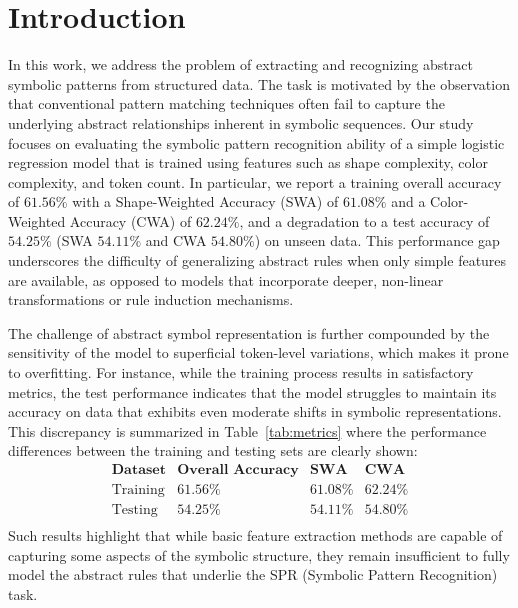\documentclass{article}
\begin{document}
\section{Introduction}
In this work, we address the problem of extracting and recognizing abstract symbolic patterns from structured data. The task is motivated by the observation that conventional pattern matching techniques often fail to capture the underlying abstract relationships inherent in symbolic sequences. Our study focuses on evaluating the symbolic pattern recognition ability of a simple logistic regression model that is trained using features such as shape complexity, color complexity, and token count. In particular, we report a training overall accuracy of \(61.56\%\) with a Shape-Weighted Accuracy (SWA) of \(61.08\%\) and a Color-Weighted Accuracy (CWA) of \(62.24\%\), and a degradation to a test accuracy of \(54.25\%\) (SWA \(54.11\%\) and CWA \(54.80\%\)) on unseen data. This performance gap underscores the difficulty of generalizing abstract rules when only simple features are available, as opposed to models that incorporate deeper, non-linear transformations or rule induction mechanisms.

The challenge of abstract symbol representation is further compounded by the sensitivity of the model to superficial token-level variations, which makes it prone to overfitting. For instance, while the training process results in satisfactory metrics, the test performance indicates that the model struggles to maintain its accuracy on data that exhibits even moderate shifts in symbolic representations. This discrepancy is summarized in Table~\ref{tab:metrics} where the performance differences between the training and testing sets are clearly shown:
\[
\begin{array}{c|c|c|c}
\textbf{Dataset} & \textbf{Overall Accuracy} & \textbf{SWA} & \textbf{CWA} \\
\hline
\text{Training} & 61.56\% & 61.08\% & 62.24\% \\
\text{Testing} & 54.25\% & 54.11\% & 54.80\% \\
\end{array}
\]
Such results highlight that while basic feature extraction methods are capable of capturing some aspects of the symbolic structure, they remain insufficient to fully model the abstract rules that underlie the SPR (Symbolic Pattern Recognition) task.
\end{document}
